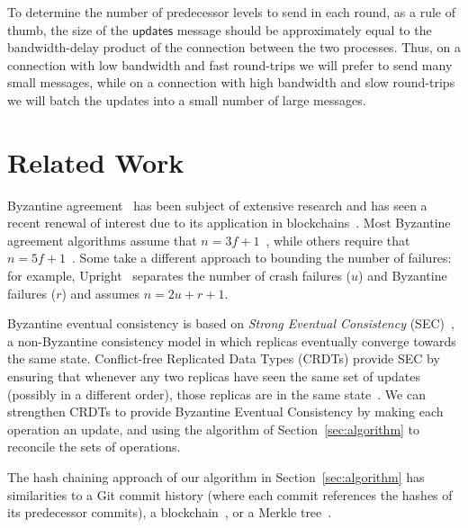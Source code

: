 \documentclass[manuscript,anonymous]{acmart}
\begin{document}
To determine the number of predecessor levels to send in each round, as a rule of thumb, the size of the $\mathsf{updates}$ message should be approximately equal to the bandwidth-delay product of the connection between the two processes.
Thus, on a connection with low bandwidth and fast round-trips we will prefer to send many small messages, while on a connection with high bandwidth and slow round-trips we will batch the updates into a small number of large messages.


\section{Related Work}

Byzantine agreement~\cite{Lamport:1982} has been subject of extensive research and has seen a recent renewal of interest due to its application in blockchains~\cite{Bano:2019}.
Most Byzantine agreement algorithms assume that $n=3f+1$~\cite{Castro:1999,Cowling:2006,Kotla:2007,Aublin:2015,Yin:2019}, while others require that $n=5f+1$~\cite{Abd:2005,Martin:2006}.
Some take a different approach to bounding the number of failures: for example, Upright~\cite{Clement:2009} separates the number of crash failures ($u$) and Byzantine failures ($r$) and assumes $n=2u+r+1$.


Byzantine eventual consistency is based on \emph{Strong Eventual Consistency} (SEC)~\cite{Shapiro:2011un}, a non-Byzantine consistency model in which replicas eventually converge towards the same state.
Conflict-free Replicated Data Types (CRDTs) provide SEC by ensuring that whenever any two replicas have seen the same set of updates (possibly in a different order), those replicas are in the same state~\cite{Shapiro:2011un}.
We can strengthen CRDTs to provide Byzantine Eventual Consistency by making each operation an update, and using the algorithm of Section~\ref{sec:algorithm} to reconcile the sets of operations.

The hash chaining approach of our algorithm in Section~\ref{sec:algorithm} has similarities to a Git commit history (where each commit references the hashes of its predecessor commits), a blockchain~\cite{Bano:2019}, or a Merkle tree~\cite{Merkle:1987}.
\end{document}
